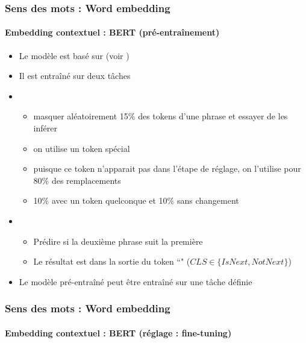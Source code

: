 \documentclass[xcolor=table]{beamer}
\begin{document}
\begin{frame}
\frametitle{Sens des mots : Word embedding}
\framesubtitle{Embedding contextuel : BERT (pré-entraînement)}
	
\begin{itemize}
	\item Le modèle est basé sur  (voir \cite{2017-vaswani-al})
	\item Il est entraîné sur deux tâches
	\item {}
	\begin{itemize}
		\item masquer aléatoirement 15\% des tokens d'une phrase et essayer de les inférer
		\item on utilise un token spécial \keyword{[MASK]}
		\item puisque ce token n'apparait pas dans l'étape de réglage, on l'utilise pour 80\% des remplacements
		\item 10\% avec un token quelconque et 10\% sans changement 
	\end{itemize}
	\item {}
	\begin{itemize}
		\item Prédire si la deuxième phrase suit la première 
		\item Le résultat est dans la sortie du token ``\keyword{[CLS]}" ($CLS \in \{IsNext, NotNext\}$)
	\end{itemize}
	\item Le modèle pré-entraîné peut être entraîné sur une tâche définie
\end{itemize}
	
\end{frame}

\begin{frame}
\frametitle{Sens des mots : Word embedding}
\framesubtitle{Embedding contextuel : BERT (réglage : fine-tuning)}

	\begin{center}
	\end{center}
	
\end{frame}
\end{document}
